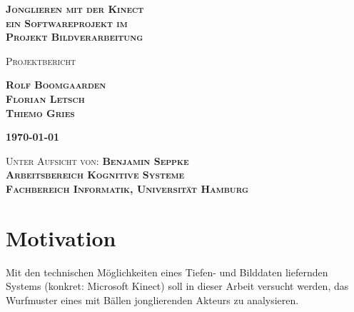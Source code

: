 \documentclass[12pt,a4paper,ngerman]{scrartcl}
\begin{document}
\begin{titlepage}

\vspace*{3 cm}

\begin{flushright}

\bfseries{\Huge\scshape Jonglieren mit der Kinect\\{\Large ein Softwareprojekt im}\\Projekt Bildverarbeitung}
\end{flushright}

\vspace{2 cm}

\begin{flushright}
\scshape{\large Projektbericht}
\end{flushright}

\begin{flushright}
\scshape{\LARGE\bfseries Rolf Boomgaarden\\}
\scshape{\LARGE\bfseries Florian Letsch\\}
\scshape{\LARGE\bfseries Thiemo Gries\\}
\end{flushright}

\vspace{2 cm}

\begin{flushright}
\scshape{\large\bfseries \today}
\end{flushright}

\vfill

\begin{flushright}

\scshape{Unter Aufsicht von: {\bfseries Benjamin Seppke}\\}
\scshape{\bfseries Arbeitsbereich Kognitive Systeme\\}
\scshape{\bfseries Fachbereich Informatik, Universität Hamburg\\}
\end{flushright}

\end{titlepage}

\tableofcontents
\newpage



\section{Motivation}

Mit den technischen Möglichkeiten eines Tiefen- und Bilddaten liefernden Systems 
(konkret: Microsoft Kinect) soll in dieser Arbeit versucht werden, das Wurfmuster
eines mit Bällen jonglierenden Akteurs zu analysieren.
\end{document}
